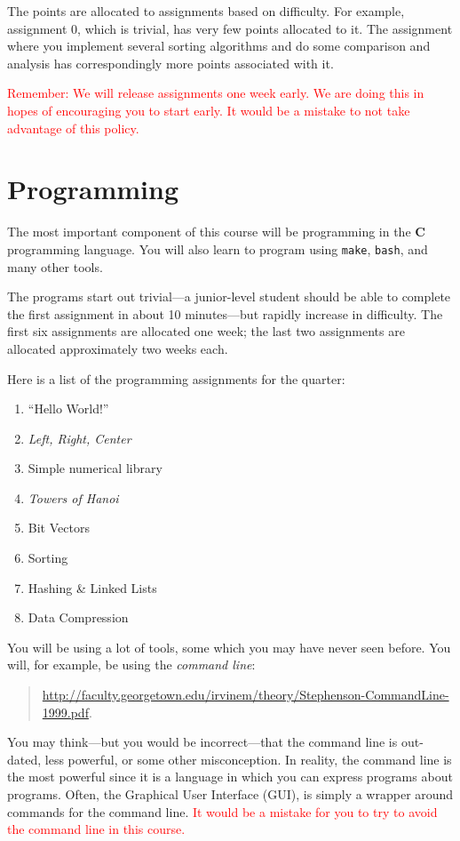 \documentclass{article}
\begin{document}
The points are allocated to assignments based on difficulty. For example,
assignment 0, which is trivial, has very few points allocated to it. The
assignment where you implement several sorting algorithms and do some
comparison and analysis has correspondingly more points associated with it.

\textcolor{red}{Remember: We will release assignments one week early. We are doing this
in hopes of encouraging you to start early. It would be a mistake to not take
advantage of this policy.}

\section{Programming}
The most important component of this course will be programming in the
\textbf{C} programming language. You will also learn to program using
\texttt{make}, \texttt{bash}, and many other tools.

The programs start out trivial---a junior-level student should be
able to complete the first assignment in about 10 minutes---but
rapidly increase in difficulty.  The first six assignments are
allocated one week; the last two assignments are allocated approximately
two weeks each. 

Here is a list of the programming assignments for the quarter:
\begin{multicols}{2}
\begin{enumerate}[start=0]
    \item ``Hello World!''
    \item \emph{Left, Right, Center}
    \item Simple numerical library
    \item \emph{Towers of Hanoi}
    \item Bit Vectors
\item Sorting
\item Hashing \& Linked Lists
\item Data Compression
\end{enumerate}
\end{multicols}

You will be using a lot of tools, some which you may have never seen before. You
will, for example, be using the \emph{command line}:
\begin{quote}
\centerline{\url{http://faculty.georgetown.edu/irvinem/theory/Stephenson-CommandLine-1999.pdf}.}
\end{quote}
You may think---but you would be incorrect---that the command line is
out-dated, less powerful, or some other misconception. In reality, the command
line is the most powerful since it is a language in which you can express
programs about programs. Often, the Graphical User Interface (GUI), is simply
a wrapper around commands for the command line.
\textcolor{red}{It would be a mistake for you to try to avoid the command line
in this course.}
\end{document}
